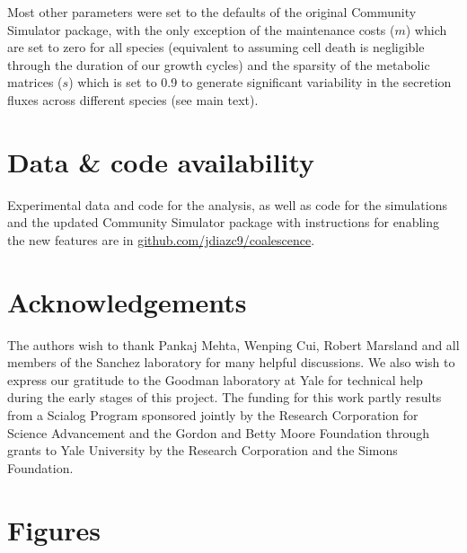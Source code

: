 \documentclass[a4paper,10pt]{article}
\begin{document}
Most other parameters were set to the defaults of the original Community Simulator
package, with the only exception of the maintenance costs ($m$) which are set to
zero for all species
(equivalent to assuming cell death is negligible through the duration of our growth cycles)
and the sparsity of the metabolic matrices ($s$) which is set to 0.9
to generate significant variability in the secretion fluxes across different species
(see main text).

\section*{Data \& code availability}\label{datacode}

Experimental data and code for the analysis, as well as code for the simulations
and the updated Community Simulator package with instructions for enabling the
new features are in \url{github.com/jdiazc9/coalescence}.

\section*{Acknowledgements}

The authors wish to thank Pankaj Mehta, Wenping Cui,
Robert Marsland and all members of the Sanchez laboratory
for many helpful discussions.
We also wish to express our gratitude to the Goodman laboratory at Yale
for technical help during the early stages of this project.
The funding for this work partly results from a Scialog Program
sponsored jointly by the Research Corporation for Science Advancement and
the Gordon and Betty Moore Foundation through grants to Yale University by the
Research Corporation and the Simons Foundation.








\clearpage

\clearpage










\clearpage

\section*{Figures}\label{figs}
\end{document}
